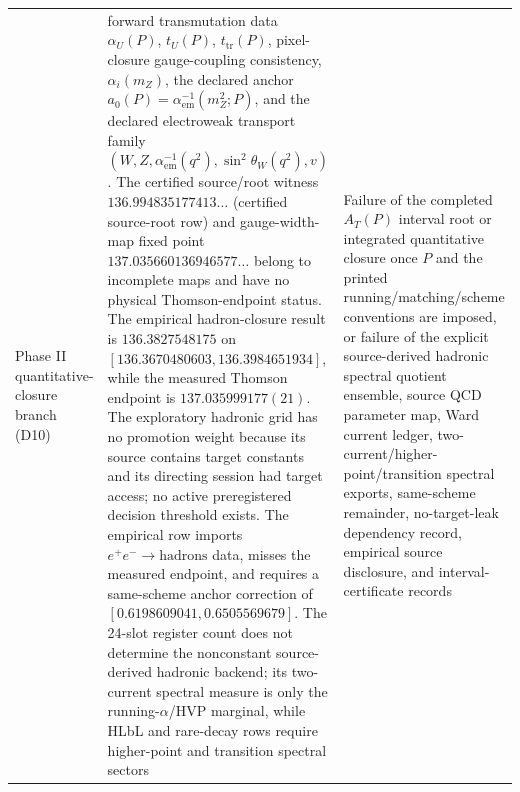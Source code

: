 \documentclass[11pt]{article}
\begin{document}
\begin{longtable}{@{}>{\raggedright\arraybackslash}p{}>{\raggedright\arraybackslash}p{}>{\raggedright\arraybackslash}p{}@{}}
Phase II quantitative-closure branch (D10) & forward transmutation data \(\alpha_U(P)\), \(t_U(P)\), \(t_{\mathrm{tr}}(P)\), pixel-closure gauge-coupling consistency, \(\alpha_i(m_Z)\), the declared anchor \(a_0(P)=\alpha_{\mathrm{em}}^{-1}(m_Z^2;P)\), and the declared electroweak transport family \((W,Z,\alpha_{\mathrm{em}}^{-1}(q^2),\sin^2\theta_W(q^2),v)\). The certified source/root witness \(136.994835177413\ldots\) (certified source-root row) and gauge-width-map fixed point \(137.035660136946577\ldots\) belong to incomplete maps and have no physical Thomson-endpoint status. The empirical hadron-closure result is \(136.3827548175\) on \([136.3670480603,136.3984651934]\), while the measured Thomson endpoint is \(137.035999177(21)\). The exploratory hadronic grid has no promotion weight because its source contains target constants and its directing session had target access; no active preregistered decision threshold exists. The empirical row imports \(e^+e^-\to\mathrm{hadrons}\) data, misses the measured endpoint, and requires a same-scheme anchor correction of \([0.6198609041,0.6505569679]\). The 24-slot register count does not determine the nonconstant source-derived hadronic backend; its two-current spectral measure is only the running-\(\alpha\)/HVP marginal, while HLbL and rare-decay rows require higher-point and transition spectral sectors & Failure of the completed \(A_T(P)\) interval root or integrated quantitative closure once \(P\) and the printed running/matching/scheme conventions are imposed, or failure of the explicit source-derived hadronic spectral quotient ensemble, source QCD parameter map, Ward current ledger, two-current/higher-point/transition spectral exports, same-scheme remainder, no-target-leak dependency record, empirical source disclosure, and interval-certificate records \\

\end{longtable}
\end{document}
